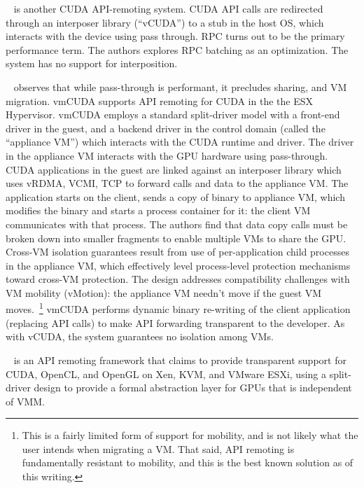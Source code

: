 ~\cite{vCUDA} is another CUDA API-remoting system.
CUDA API calls are redirected through an interposer library (``vCUDA'') to a
stub in the host OS, which interacts with the device using pass through. RPC
turns out to be the primary performance term. The authors explores RPC
batching as an optimization. The system has no support for interposition.

~\cite{vmCUDA} observes that while pass-through is
performant, it precludes sharing, and VM migration. vmCUDA supports API remoting for CUDA in the the ESX Hypervisor. vmCUDA employs a standard split-driver model with a front-end driver in the guest, and a backend driver in the control domain (called the ``appliance VM'') which interacts with the CUDA runtime and driver. The driver in the appliance VM interacts with the GPU hardware using pass-through. CUDA applications in the guest are linked against an interposer library which uses vRDMA, VCMI, TCP to forward calls and data to the appliance VM. The application starts on the client, sends a copy of binary to appliance VM, which modifies the binary and starts a process container for it: the client VM communicates with that process. The authors find that data copy calls must be broken down into smaller fragments to enable multiple VMs to share the GPU. Cross-VM isolation guarantees result from use of per-application child processes in the appliance VM, which effectively level process-level protection mechanisms toward cross-VM protection. The design addresses compatibility challenges with VM mobility (vMotion): the appliance VM needn't move if the guest VM moves.~\footnote{This is a fairly limited form of support for mobility, and is not likely what the user intends when migrating a VM. That said, API remoting is fundamentally resistant to mobility, and this is the best known solution as of this writing.} vmCUDA performs dynamic binary re-writing of the client application (replacing API calls) to make API forwarding transparent to the developer. As with vCUDA, the system guarantees no isolation among VMs.

~\cite{gVirtuS} is an API remoting framework that claims
to provide transparent support for CUDA, OpenCL, and OpenGL on Xen, KVM, and
VMware ESXi, using a split-driver design to provide a formal abstraction layer
for GPUs that is independent of VMM.

